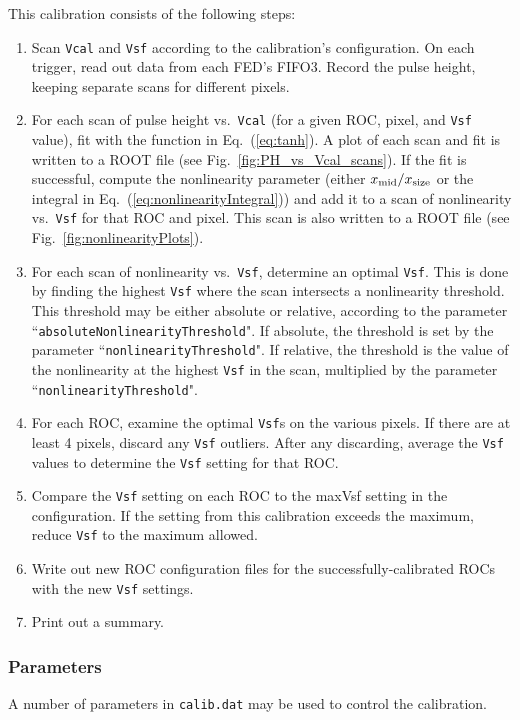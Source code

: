 This calibration consists of the following steps:
\begin{enumerate}
\item Scan \verb|Vcal| and \verb|Vsf| according to the calibration's configuration.  On each trigger, read out data from each FED's FIFO3.  Record the pulse height, keeping separate scans for different pixels.
\item For each scan of pulse height vs.~\verb|Vcal| (for a given ROC, pixel, and \verb|Vsf| value), fit with the function in Eq.~(\ref{eq:tanh}).  A plot of each scan and fit is written to a ROOT file (see Fig.~\ref{fig:PH_vs_Vcal_scans}).  If the fit is successful, compute the nonlinearity parameter (either $x_{\rm mid}/x_{\rm size}$ or the integral in Eq.~(\ref{eq:nonlinearityIntegral})) and add it to a scan of nonlinearity vs.~\verb|Vsf| for that ROC and pixel.  This scan is also written to a ROOT file (see Fig.~\ref{fig:nonlinearityPlots}).
\item For each scan of nonlinearity vs.~\verb|Vsf|, determine an optimal \verb|Vsf|.  This is done by finding the highest \verb|Vsf| where the scan intersects a nonlinearity threshold.  This threshold may be either absolute or relative, according to the parameter ``\verb|absoluteNonlinearityThreshold|".  If absolute, the threshold is set by the parameter ``\verb|nonlinearityThreshold|".  If relative, the threshold is the value of the nonlinearity at the highest \verb|Vsf| in the scan, multiplied by the parameter ``\verb|nonlinearityThreshold|".
\item For each ROC, examine the optimal \verb|Vsf|s on the various pixels.  If there are at least 4 pixels, discard any \verb|Vsf| outliers.  After any discarding, average the \verb|Vsf| values to determine the \verb|Vsf| setting for that ROC.
\item Compare the \verb|Vsf| setting on each ROC to the maxVsf setting in the configuration.  If the setting from this calibration exceeds the maximum, reduce \verb|Vsf| to the maximum allowed.
\item Write out new ROC configuration files for the successfully-calibrated
ROCs with the new \verb|Vsf| settings.
\item Print out a summary.
\end{enumerate}

\subsubsection{Parameters}
A number of parameters in \verb|calib.dat| may be used to control the
calibration.

